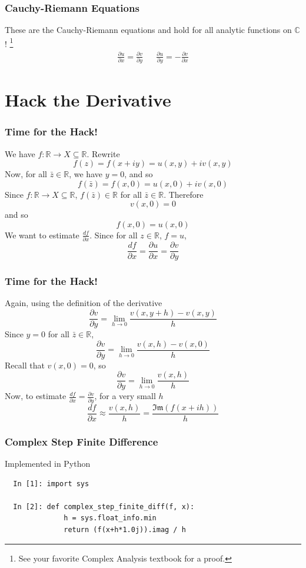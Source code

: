 \documentclass{beamer}
\def\R{\mathbb{R}}                     %
\def\C{\mathbb{C}}                     %
\begin{document}
\begin{frame}
\frametitle{Cauchy-Riemann Equations}
  These are the Cauchy-Riemann equations and hold for all analytic functions on $\C$! \footnote{See your favorite Complex Analysis textbook for a proof.}
  \begin{eqnarray*}
  \frac{\partial u}{\partial x} = \frac{\partial v}{\partial y} &&
  \frac{\partial u}{\partial y} = -\frac{\partial v}{\partial x}
  \end{eqnarray*}



\end{frame}


\section{Hack the Derivative}
\begin{frame}
\frametitle{Time for the Hack!}

  We have $f:\R \to X \subseteq \R$. Rewrite
  \[ f(z) = f(x+iy) = u(x,y) + iv(x,y) \]
  \pause
  Now, for all $\bar{z} \in \R$, we have $y = 0$, and so
  \[ f(\bar{z}) = f(x,0) = u(x,0) + iv(x,0) \]
  \pause
  Since $f: \R \to X \subseteq \R$, $f(\bar{z}) \in \R$ for all $\bar{z} \in \R$. Therefore
  \[ v(x,0) = 0 \]
  \pause
  and so
  \[ f(x,0) = u(x,0) \]
  \pause
  We want to estimate $\frac{df}{\partial x}$. Since for all $z \in \R$, $f = u$,
  \[ \frac{df}{\partial x} = \frac{\partial u}{\partial x} = \frac{\partial v}{\partial y} \]

\end{frame}

\begin{frame}
\frametitle{Time for the Hack!}

  Again, using the definition of the derivative
  \[ \frac{\partial v}{\partial y} = \lim_{h \to 0} \frac{v(x,y+h) - v(x,y)}{h} \]
  \pause
  Since $y = 0$ for all $\bar{z} \in \R$,
  \[ \frac{\partial v}{\partial y} = \lim_{h \to 0} \frac{v(x,h) - v(x,0)}{h} \]
  \pause
  Recall that $v(x,0) = 0$, so
  \[ \frac{\partial v}{\partial y} = \lim_{h \to 0} \frac{v(x,h)}{h} \]
  \pause
  Now, to estimate $\frac{df}{\partial x} = \frac{\partial v}{\partial y}$, for a very small $h$
  \[ \frac{df}{\partial x} \approx \frac{v(x,h)}{h} = \frac{\mathfrak{Im}(f(x+ih))}{h} \]


\end{frame}

\begin{frame}[fragile]
\frametitle{Complex Step Finite Difference}

Implemented in Python


\begin{lstlisting}
  In [1]: import sys

  In [2]: def complex_step_finite_diff(f, x):
              h = sys.float_info.min
              return (f(x+h*1.0j)).imag / h
\end{lstlisting}
\end{frame}
\end{document}
